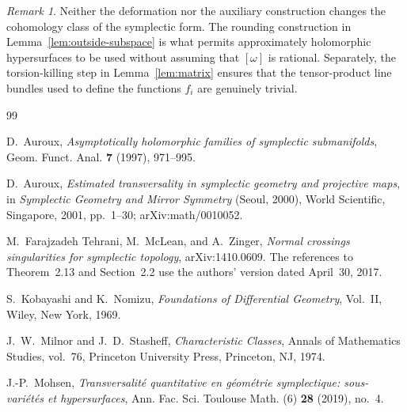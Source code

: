 \documentclass[11pt]{article}
\theoremstyle{definition}
\theoremstyle{remark}
\newtheorem{remark}[theorem]{Remark}
\begin{document}
\begin{remark}
Neither the deformation nor the auxiliary construction changes
the cohomology class of the symplectic form.  The rounding
construction in Lemma~\ref{lem:outside-subspace} is what permits
approximately holomorphic hypersurfaces to be used without
assuming that $[\omega]$ is rational.  Separately, the
torsion-killing step in Lemma~\ref{lem:matrix} ensures that the
tensor-product line bundles used to define the functions
$f_i$ are genuinely trivial.
\end{remark}

\begin{thebibliography}{99}

D.~Auroux,
\emph{Asymptotically holomorphic families of symplectic submanifolds},
Geom. Funct. Anal. \textbf{7} (1997), 971--995.

D.~Auroux,
\emph{Estimated transversality in symplectic geometry and projective maps},
in \emph{Symplectic Geometry and Mirror Symmetry}
(Seoul, 2000), World Scientific, Singapore, 2001, pp.~1--30;
arXiv:math/0010052.

M.~Farajzadeh Tehrani, M.~McLean, and A.~Zinger,
\emph{Normal crossings singularities for symplectic topology},
arXiv:1410.0609.
The references to Theorem~2.13 and Section~2.2 use the authors'
version dated April~30, 2017.

S.~Kobayashi and K.~Nomizu,
\emph{Foundations of Differential Geometry}, Vol.~II,
Wiley, New York, 1969.

J.~W.~Milnor and J.~D.~Stasheff,
\emph{Characteristic Classes},
Annals of Mathematics Studies, vol.~76,
Princeton University Press, Princeton, NJ, 1974.

J.-P.~Mohsen,
\emph{Transversalit\'e quantitative en g\'eom\'etrie symplectique:
sous-vari\'et\'es et hypersurfaces},
Ann. Fac. Sci. Toulouse Math. (6) \textbf{28} (2019), no.~4.

\end{thebibliography}
\end{document}
